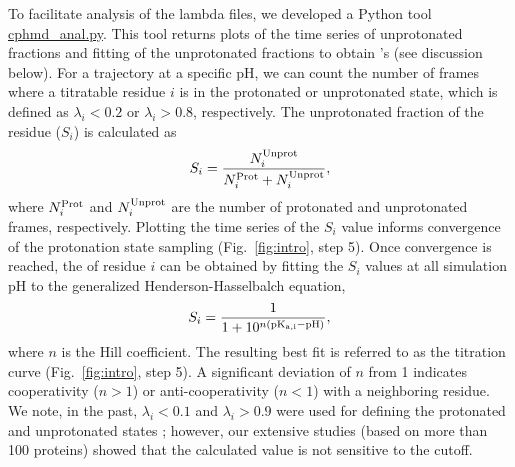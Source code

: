 To facilitate analysis of the lambda files, we developed a Python tool \href{https://gitlab.com/shenlab-amber-cphmd/cphmd-analysis}{cphmd\_anal.py}. 
This tool returns plots of the time series of unprotonated fractions and fitting of the unprotonated fractions to obtain {\pka's} (see discussion below).
For a trajectory at a specific pH, 
we can count the number of frames where a titratable residue $i$ is 
in the protonated or unprotonated state, which is defined 
as $\lambda_i < 0.2$ or $\lambda_i > 0.8$, respectively.
The unprotonated fraction of the residue ($S_i$)
is calculated as
\begin{equation}
S_i = \frac{N_i^{\rm Unprot}}{N_i^{\rm Prot} + N_i^{\rm Unprot}},
\end{equation}
where $N_i^{\rm Prot}$ and $N_i^{\rm Unprot}$ are
the number of protonated and unprotonated frames,
respectively.
Plotting the time series of the $S_i$ value informs
convergence of the protonation state sampling (Fig.~\ref{fig:intro}, step 5).
Once convergence is reached, the {\pka} of residue $i$
can be obtained by fitting the $S_i$ 
values at all simulation pH to 
the generalized Henderson-Hasselbalch equation,
\begin{equation}
S_i = \frac{1}{1+10^{n(\rm pK_{a,i} - pH)}},
\end{equation}
where $n$ is the Hill coefficient.
The resulting best fit is referred to as the titration curve (Fig.~\ref{fig:intro}, step 5).
A significant deviation of $n$ from 1 indicates cooperativity
($n>1$)
or anti-cooperativity ($n<1$) with a neighboring residue.
We note, in the past, $\lambda_i < 0.1$ and $\lambda_i > 0.9$ were used for
defining the protonated and unprotonated states \cite{Khandogin_Brooks_2005_Biophys.J.,Khandogin_Brooks_2006_Biochemistry}; however, our extensive studies (based on more than 100 proteins) showed that the calculated {\pka} value is not sensitive to the cutoff.


